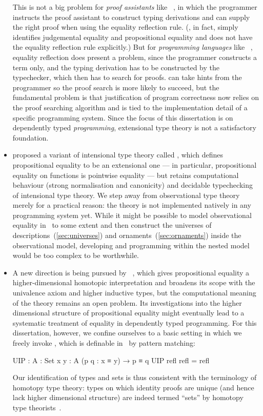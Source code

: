 \begin{itemize}
This is not a big problem for \emph{proof assistants} like ~\citep{Constable-Nuprl}, in which the programmer instructs the proof assistant to construct typing derivations and can supply the right proof when using the equality reflection rule.
(, in fact, simply identifies judgemental equality and propositional equality and does not have the equality reflection rule explicitly.)
But for \emph{programming languages} like ~\citep{Sheard-Omega}, equality reflection does present a problem, since the programmer constructs a term only, and the typing derivation has to be constructed by the typechecker, which then has to search for proofs.
 can take hints from the programmer so the proof search is more likely to succeed, but the fundamental problem is that justification of program correctness now relies on the proof searching algorithm and is tied to the implementation detail of a specific programming system.
Since the focus of this dissertation is on dependently typed \emph{programming}, extensional type theory is not a satisfactory foundation.

\item \citet{Altenkirch-OTT} proposed a variant of intensional type theory called , which defines propositional equality to be an extensional one --- in particular, propositional equality on functions is pointwise equality --- but retains computational behaviour (strong normalisation and canonicity) and decidable typechecking of intensional type theory.
We step away from observational type theory merely for a practical reason: the theory is not implemented natively in any programming system yet.
While it might be possible to model observational equality in \Agda\ to some extent and then construct the universes of descriptions~(\autoref{sec:universes}) and ornaments~(\autoref{sec:ornaments}) inside the observational model, developing and programming within the nested model would be too complex to be worthwhile.

\item A new direction is being pursued by ~\citep{UFP-HoTT}, which gives propositional equality a higher-dimensional homotopic interpretation and broadens its scope with the univalence axiom and higher inductive types, but the computational meaning of the theory remains an open problem.
Its investigations into the higher dimensional structure of propositional equality might eventually lead to a systematic treatment of equality in dependently typed programming.
For this dissertation, however, we confine ourselves to a basic setting in which we freely invoke , which is definable in \Agda\ by pattern matching:
\begin{code}
UIP : {A : Set} {x y : A} (p q : x ≡ y) → p ≡ q
UIP refl refl = refl
\end{code}
Our identification of types and sets is thus consistent with the terminology of homotopy type theory: types on which identity proofs are unique (and hence lack higher dimensional structure) are indeed termed ``sets'' by homotopy type theorists~\cite[Section~3.1]{UFP-HoTT}.
\end{itemize}

